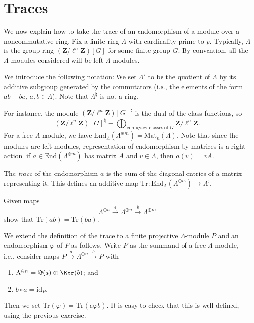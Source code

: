 \section{Traces}
\label{section-traces}

\noindent
We now explain how to take the trace of an endomorphism of a module over a
noncommutative ring. Fix a finite ring $\Lambda$ with cardinality prime to $p$.
Typically, $\Lambda$ is the group ring $(\mathbf{Z}/\ell^n\mathbf{Z})[G]$ for
some finite group $G$. By convention, all the $\Lambda$-modules considered will
be left $\Lambda$-modules.

\medskip\noindent
We introduce the following notation:
We set $\Lambda^\natural$ to be the quotient of $\Lambda$ by its additive
subgroup generated by the commutators (i.e., the elements of the form
$ab-ba$, $a, b \in \Lambda$). Note that $\Lambda^\natural$ is not a ring.

\medskip\noindent
For instance, the module $(\mathbf{Z}/\ell^n\mathbf{Z})[G]^\natural$ is the
dual of the class functions, so
$$
(\mathbf{Z}/\ell^n\mathbf{Z})[G]^\natural
=
\bigoplus\nolimits_{\text{conjugacy classes of }G}
\mathbf{Z}/\ell^n\mathbf{Z}.
$$
For a free $\Lambda$-module, we have $\text{End}_\Lambda(\Lambda^{\oplus m}) =
\text{Mat}_n(\Lambda)$. Note that since the modules are left modules,
representation of endomorphism by matrices is a right action: if $a \in
\text{End}(\Lambda^{\oplus m})$ has matrix $A$ and $v \in \Lambda$, then $a(v)
= v A$.

\begin{definition}
\label{definition-trace}
The {\it trace} of the endomorphism $a$ is the sum of the diagonal entries of
a matrix representing it. This defines an additive map $\text{Tr} :
\text{End}_\Lambda(\Lambda^{\oplus m}) \to \Lambda^\natural$.
\end{definition}

\begin{exercise}
\label{exercise-trace-is-trace}
Given maps
$$
\Lambda^{\oplus n} \xrightarrow{a}
\Lambda^{\oplus n} \xrightarrow{b}
\Lambda^{\oplus m}
$$
show that $\text{Tr}(ab) = \text{Tr}(ba)$.
\end{exercise}

\noindent
We extend the definition of the trace to a finite projective $\Lambda$-module
$P$ and an endomorphism $\varphi$ of $P$ as follows. Write $P$ as the summand
of a free $\Lambda$-module, i.e., consider maps $P \xrightarrow{a}
\Lambda^{\oplus n} \xrightarrow{b} P$ with
\begin{enumerate}
\item
$\Lambda^{\oplus n} = \Im(a) \oplus \Ker(b)$; and
\item
$b\circ a = \text{id}_P$.
\end{enumerate}
Then we set $\text{Tr}(\varphi) = \text{Tr}(a\varphi b)$. It is easy to check
that this is well-defined, using the previous exercise.








